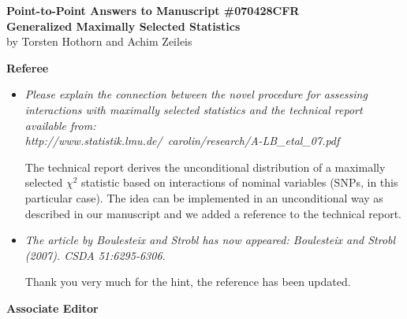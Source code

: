 \documentclass[11pt,a4paper]{article}
\begin{document}


\begin{center}
\textbf{\large Point-to-Point Answers to Manuscript \#070428CFR \\
Generalized Maximally Selected Statistics} \\
by Torsten Hothorn and Achim Zeileis
\end{center}

\vspace*{1cm}

\textbf{\large Referee}

\begin{itemize}

  \item \textit{Please explain the connection between the novel procedure
for assessing interactions with maximally selected statistics and
the technical report available from: \\
http://www.statistik.lmu.de/~carolin/research/A-LB\_etal\_07.pdf}

The technical report derives the unconditional distribution of
a maximally selected $\chi^2$ statistic based on interactions
of nominal variables (SNPs, in this particular case). The idea 
can be implemented in an unconditional way as described in 
our manuscript and we added a reference to the technical report.

\item \textit{The article by Boulesteix and Strobl has now appeared:
Boulesteix and Strobl (2007). CSDA 51:6295-6306.}

Thank you very much for the hint, the reference has been updated.

\end{itemize}

\textbf{\large Associate Editor}
\end{document}
